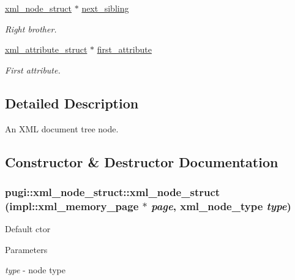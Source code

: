 \begin{DoxyCompactItemize}
\hyperlink{structpugi_1_1xml__node__struct}{xml\_\-node\_\-struct} $\ast$ \hyperlink{structpugi_1_1xml__node__struct_acf0867e3a77871e37132046d97398a6d}{next\_\-sibling}
\begin{DoxyCompactList}\small\item\em Right brother. \item\end{DoxyCompactList}\item 
\hyperlink{structpugi_1_1xml__attribute__struct}{xml\_\-attribute\_\-struct} $\ast$ \hyperlink{structpugi_1_1xml__node__struct_a482d2daf97ce0745661cb2c57d8f6fb3}{first\_\-attribute}
\begin{DoxyCompactList}\small\item\em First attribute. \item\end{DoxyCompactList}\end{DoxyCompactItemize}


\subsection{Detailed Description}
An XML document tree node. 

\subsection{Constructor \& Destructor Documentation}
\hypertarget{structpugi_1_1xml__node__struct_af9af20f835af8b6b99f9a39c93920ea6}{
\subsubsection[{xml\_\-node\_\-struct}]{\setlength{\rightskip}{0pt plus 5cm}pugi::xml\_\-node\_\-struct::xml\_\-node\_\-struct (impl::xml\_\-memory\_\-page $\ast$ {\em page}, \/  xml\_\-node\_\-type {\em type})}}
\label{structpugi_1_1xml__node__struct_af9af20f835af8b6b99f9a39c93920ea6}
Default ctor 
\begin{DoxyParams}{Parameters}
\item[{\em type}]-\/ node type \end{DoxyParams}


